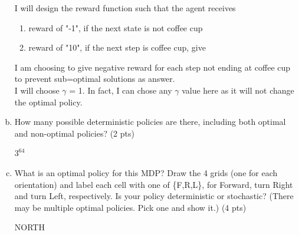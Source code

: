 \documentclass[12pt]{article}
\begin{document}
\begin{enumerate}[a)]
\begin{solution}
I will design the reward function such that the agent receives 
\begin{enumerate}
\item reward of "-1", if the next state is not coffee cup
\item reward of "10", if the next step is coffee cup, give
\end{enumerate}

I am choosing to give negative reward for each step not ending at coffee cup to prevent sub=optimal solutions as answer. \\

I will choose $\gamma$ = 1. In fact, I can chose any $\gamma$ value here as it will not change the optimal policy.\\
\end{solution}

\item How many possible deterministic policies are there, including both optimal and non-optimal policies? (2 pts)

\begin{solution}
$3^{64}$
\end{solution}

\item What is an optimal policy for this MDP? Draw the 4 grids (one for each orientation) and label each cell with one of \{F,R,L\}, for Forward, turn Right and turn Left, respectively. Is your policy deterministic or stochastic? (There may be multiple optimal policies. Pick one and show it.) (4 pts)

\begin{solution}
\end{solution}
NORTH
\begin{figure}[h]
  \centering
\end{figure}
\end{enumerate}
\end{document}
